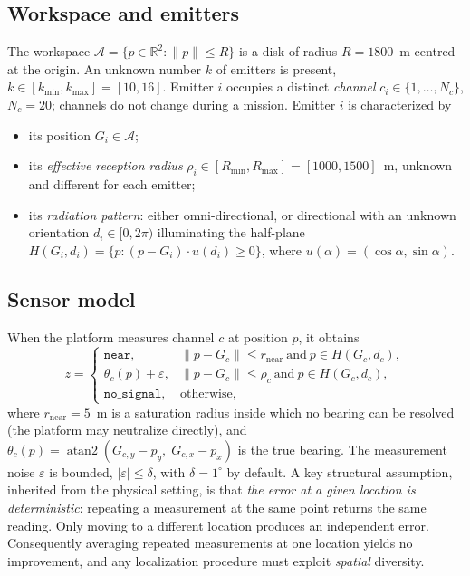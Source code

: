 \documentclass[journal,10pt]{IEEEtran}
\theoremstyle{definition}
\newcommand{\Rmin}{R_{\min}}
\newcommand{\Rmax}{R_{\max}}
\newcommand{\bA}{\mathcal{A}}
\newcommand{\R}{\mathbb{R}}
\begin{document}
\subsection{Workspace and emitters}
The workspace $\bA=\{p\in\R^2:\|p\|\le R\}$ is a disk of radius $R=1800$~m centred at the
origin. An unknown number $k$ of emitters is present, $k\in[k_{\min},k_{\max}]=[10,16]$. Emitter
$i$ occupies a distinct \emph{channel} $c_i\in\{1,\dots,N_c\}$, $N_c=20$; channels do not change
during a mission. Emitter $i$ is characterized by
\begin{itemize}
\item its position $G_i\in\bA$;
\item its \emph{effective reception radius} $\rho_i\in[\Rmin,\Rmax]=[1000,1500]$~m, unknown and
different for each emitter;
\item its \emph{radiation pattern}: either omni-directional, or directional with an unknown
orientation $d_i\in[0,2\pi)$ illuminating the half-plane
$H(G_i,d_i)=\{p:(p-G_i)\cdot u(d_i)\ge0\}$, where $u(\alpha)=(\cos\alpha,\sin\alpha)$.
\end{itemize}

\subsection{Sensor model}
\label{sec:sensor}
When the platform measures channel $c$ at position $p$, it obtains
\begin{equation}
z=\begin{cases}
\texttt{near}, & \|p-G_c\|\le r_{\mathrm{near}}\ \text{and}\ p\in H(G_c,d_c),\\
\theta_c(p)+\varepsilon, & \|p-G_c\|\le\rho_c\ \text{and}\ p\in H(G_c,d_c),\\
\texttt{no\_signal}, & \text{otherwise},
\end{cases}
\label{eq:sensor}
\end{equation}
where $r_{\mathrm{near}}=5$~m is a saturation radius inside which no bearing can be resolved
(the platform may neutralize directly), and
$\theta_c(p)=\operatorname{atan2}(G_{c,y}-p_y,\;G_{c,x}-p_x)$ is the true bearing. The measurement
noise $\varepsilon$ is bounded, $|\varepsilon|\le\delta$, with $\delta=1^\circ$ by default. A key
structural assumption, inherited from the physical setting, is that \emph{the error at a given
location is deterministic}: repeating a measurement at the same point returns the same reading.
Only moving to a different location produces an independent error. Consequently averaging
repeated measurements at one location yields no improvement, and any localization procedure must
exploit \emph{spatial} diversity.
\end{document}
